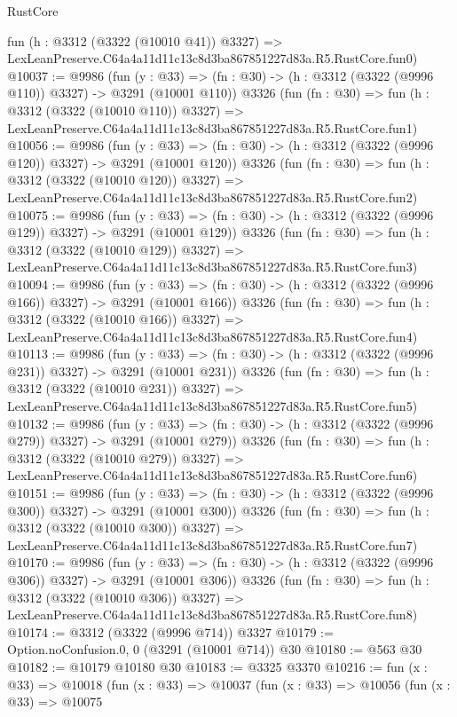 \begin{lexlean}{RustCore}
\begin{coremodule}
    fun (h : @3312 (@3322 (@10010 @41)) @3327) =>
    LexLeanPreserve.C64a4a11d11c13c8d3ba867851227d83a.R5.RustCore.fun0)
@10037 := @9986
    (fun (y : @33) => (fn : @30) -> (h : @3312 (@3322 (@9996 @110)) @3327) -> @3291 (@10001 @110))
    @3326
    (fun (fn : @30) =>
    fun (h : @3312 (@3322 (@10010 @110)) @3327) =>
    LexLeanPreserve.C64a4a11d11c13c8d3ba867851227d83a.R5.RustCore.fun1)
@10056 := @9986
    (fun (y : @33) => (fn : @30) -> (h : @3312 (@3322 (@9996 @120)) @3327) -> @3291 (@10001 @120))
    @3326
    (fun (fn : @30) =>
    fun (h : @3312 (@3322 (@10010 @120)) @3327) =>
    LexLeanPreserve.C64a4a11d11c13c8d3ba867851227d83a.R5.RustCore.fun2)
@10075 := @9986
    (fun (y : @33) => (fn : @30) -> (h : @3312 (@3322 (@9996 @129)) @3327) -> @3291 (@10001 @129))
    @3326
    (fun (fn : @30) =>
    fun (h : @3312 (@3322 (@10010 @129)) @3327) =>
    LexLeanPreserve.C64a4a11d11c13c8d3ba867851227d83a.R5.RustCore.fun3)
@10094 := @9986
    (fun (y : @33) => (fn : @30) -> (h : @3312 (@3322 (@9996 @166)) @3327) -> @3291 (@10001 @166))
    @3326
    (fun (fn : @30) =>
    fun (h : @3312 (@3322 (@10010 @166)) @3327) =>
    LexLeanPreserve.C64a4a11d11c13c8d3ba867851227d83a.R5.RustCore.fun4)
@10113 := @9986
    (fun (y : @33) => (fn : @30) -> (h : @3312 (@3322 (@9996 @231)) @3327) -> @3291 (@10001 @231))
    @3326
    (fun (fn : @30) =>
    fun (h : @3312 (@3322 (@10010 @231)) @3327) =>
    LexLeanPreserve.C64a4a11d11c13c8d3ba867851227d83a.R5.RustCore.fun5)
@10132 := @9986
    (fun (y : @33) => (fn : @30) -> (h : @3312 (@3322 (@9996 @279)) @3327) -> @3291 (@10001 @279))
    @3326
    (fun (fn : @30) =>
    fun (h : @3312 (@3322 (@10010 @279)) @3327) =>
    LexLeanPreserve.C64a4a11d11c13c8d3ba867851227d83a.R5.RustCore.fun6)
@10151 := @9986
    (fun (y : @33) => (fn : @30) -> (h : @3312 (@3322 (@9996 @300)) @3327) -> @3291 (@10001 @300))
    @3326
    (fun (fn : @30) =>
    fun (h : @3312 (@3322 (@10010 @300)) @3327) =>
    LexLeanPreserve.C64a4a11d11c13c8d3ba867851227d83a.R5.RustCore.fun7)
@10170 := @9986
    (fun (y : @33) => (fn : @30) -> (h : @3312 (@3322 (@9996 @306)) @3327) -> @3291 (@10001 @306))
    @3326
    (fun (fn : @30) =>
    fun (h : @3312 (@3322 (@10010 @306)) @3327) =>
    LexLeanPreserve.C64a4a11d11c13c8d3ba867851227d83a.R5.RustCore.fun8)
@10174 := @3312 (@3322 (@9996 @714)) @3327
@10179 := Option.noConfusion.{0, 0} (@3291 (@10001 @714)) @30
@10180 := @563 @30
@10182 := @10179 @10180 @30
@10183 := @3325 @3370
@10216 := fun (x : @33) =>
  @10018
    (fun (x : @33) =>
    @10037
      (fun (x : @33) =>
      @10056
        (fun (x : @33) =>
        @10075

\end{coremodule}
\end{lexlean}
